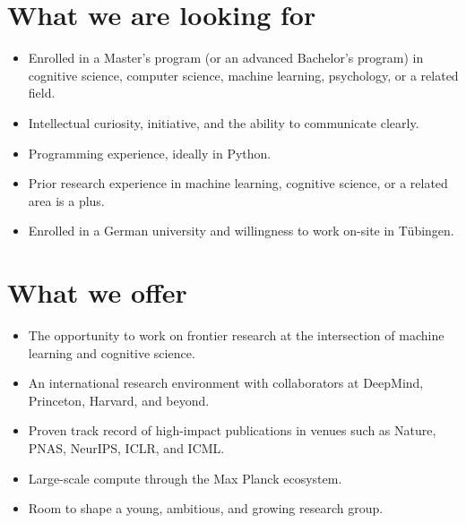 \section*{What we are looking for}
\begin{itemize}
  \item Enrolled in a Master's program (or an advanced Bachelor's program) in cognitive science, computer science, machine learning, psychology, or a related field.
  \item Intellectual curiosity, initiative, and the ability to communicate clearly.
  \item Programming experience, ideally in Python.
  \item Prior research experience in machine learning, cognitive science, or a related area is a plus.
  \item Enrolled in a German university and willingness to work on-site in Tübingen.
\end{itemize}

\section*{What we offer}
\begin{itemize}
  \item The opportunity to work on frontier research at the intersection of machine learning and cognitive science.
  \item An international research environment with collaborators at DeepMind, Princeton, Harvard, and beyond.
  \item Proven track record of high-impact publications in venues such as Nature, PNAS, NeurIPS, ICLR, and ICML.
  \item Large-scale compute through the Max Planck ecosystem.
  \item Room to shape a young, ambitious, and growing research group. 
\end{itemize}

